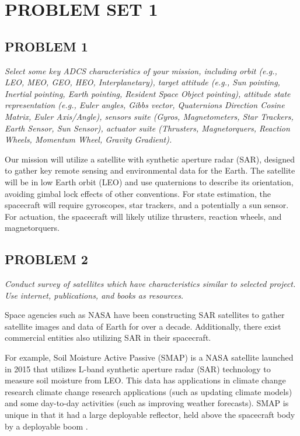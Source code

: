 \section{\Large PROBLEM SET 1}
\subsection{PROBLEM 1}
\textit{Select some key ADCS characteristics of your mission, including orbit (e.g., LEO, MEO, GEO, HEO, Interplanetary), target attitude (e.g., Sun pointing, Inertial pointing, Earth pointing, Resident Space Object pointing), attitude state representation (e.g., Euler angles, Gibbs vector, Quaternions Direction Cosine Matrix, Euler Axis/Angle), sensors suite (Gyros, Magnetometers, Star Trackers, Earth Sensor, Sun Sensor), actuator suite (Thrusters, Magnetorquers, Reaction Wheels, Momentum Wheel, Gravity Gradient).}

Our mission will utilize a satellite with synthetic aperture radar (SAR), designed to gather key remote sensing and environmental data for the Earth. The satellite will be in low Earth orbit (LEO) and use quaternions to describe its orientation, avoiding gimbal lock effects of other conventions. For state estimation, the spacecraft will require gyroscopes, star trackers, and a potentially a sun sensor. For actuation, the spacecraft will likely utilize thrusters, reaction wheels, and magnetorquers.

\subsection{PROBLEM 2}
\textit{Conduct survey of satellites which have characteristics similar to selected project. Use internet, publications, and books as resources.}

Space agencies such as NASA have been constructing SAR satellites to gather satellite images and data of Earth for over a decade. Additionally, there exist commercial entities also utilizing SAR in their spacecraft.

For example, Soil Moisture Active Passive (SMAP) is a NASA satellite launched in 2015 that utilizes L-band synthetic aperture radar (SAR) technology to measure soil moisture from LEO. This data has applications in climate change research climate change research applications (such as updating climate models) and some day-to-day activities (such as improving weather forecasts). SMAP is unique in that it had a large deployable reflector, held above the spacecraft body by a deployable boom \cite{SMAP}.

